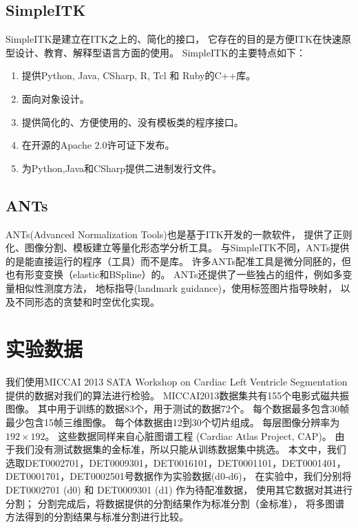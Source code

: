 \subsection{SimpleITK}
SimpleITK是建立在ITK之上的、简化的接口，
它存在的目的是方便ITK在快速原型设计、教育、解释型语言方面的使用。
SimpleITK的主要特点如下：
\begin{enumerate}
\item 提供Python, Java, CSharp, R, Tcl 和 Ruby的C++库。
\item 面向对象设计。
\item 提供简化的、方便使用的、没有模板类的程序接口。
\item 在开源的Apache 2.0许可证下发布。
\item 为Python,Java和CSharp提供二进制发行文件。
\end{enumerate}

\subsection{ANTs}
ANTs(Advanced Normalization Tools)也是基于ITK开发的一款软件，
提供了正则化、图像分割、模板建立等量化形态学分析工具。
与SimpleITK不同，ANTs提供的是能直接运行的程序（工具）而不是库。
许多ANTs配准工具是微分同胚的，但也有形变变换（elastic和BSpline）的。
ANTs还提供了一些独占的组件，例如多变量相似性测度方法，
地标指导(landmark guidance)，使用标签图片指导映射，
以及不同形态的贪婪和时空优化实现。

\section{实验数据}

我们使用MICCAI 2013 SATA Workshop on  Cardiac Left Ventricle Segmentation
提供的数据对我们的算法进行检验。
MICCAI2013数据集共有155个电影式磁共振图像。
其中用于训练的数据83个，用于测试的数据72个。
每个数据最多包含30帧最少包含15帧三维图像。
每个体数据由12到30个切片组成。
每层图像分辨率为$192\times192$。
这些数据同样来自心脏图谱工程
(Cardiac Atlas Project, CAP)。
由于我们没有测试数据集的金标准，所以只能从训练数据集中挑选。
本文中，我们选取DET0002701，DET0009301，DET0016101，DET0001101，DET0001401，
DET0001701，DET0002501号数据作为实验数据(d0-d6)，
在实验中，我们分别将 DET0002701 (d0) 和 DET0009301 (d1) 作为待配准数据，
使用其它数据对其进行分割；
分割完成后，将数据提供的分割结果作为标准分割（金标准），
将多图谱方法得到的分割结果与标准分割进行比较。

